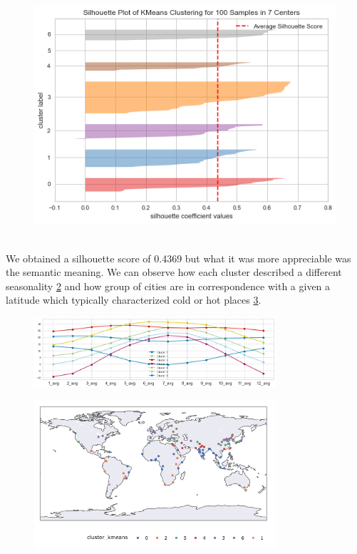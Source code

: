 \begin{figure}[h]
\begin{minipage}{.33\textwidth}
	    \includegraphics[width=\textwidth]{plots/timeseries/silhouette score 2.png}
	    \label{fig:silhouette_score2}
	\end{minipage}
\end{figure}\\
We obtained a silhouette score of 0.4369 but what it was more appreciable was the semantic meaning.
We can observe how each cluster described a different seasonality \ref{fig:centroids} and how group of cities are in correspondence with a given a latitude which typically characterized cold or hot places \ref{fig:geoplot}.\\
\begin{figure}[h!]
		\centering
		\includegraphics[width=0.8\textwidth]{plots/timeseries/centroids.png}
		\label{fig:centroids}
\end{figure}
\begin{figure}[h!]
		\centering
		\includegraphics[width=0.8\textwidth]{plots/timeseries/geoplot.png}
		\label{fig:geoplot}
\end{figure}
